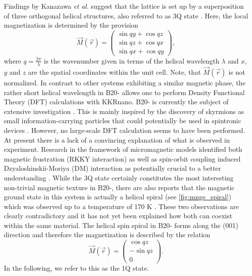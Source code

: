 \documentclass [a4paper, 12pt]{article}
\newcommand{\beq}{\begin{equation}}
\newcommand{\eeq}{\end{equation}}
\begin{document}
Findings by Kanazawa \textit{et al.} suggest that the lattice is set up by a superposition of three orthogonal
helical structures, also referred to as 3Q state \cite{kanazawa_noncentrosymmetric_2017}. 
Here, the local magnetization is determined by the provision
\beq
\label{eq:3q_formula}
\vec{M}(\vec{r}) =
\begin{pmatrix}
	\sin{qy} + \cos{qz} \\
	\sin{qz} + \cos{qx} \\
	\sin{qx} + \cos{qy}
\end{pmatrix},
\eeq
where $q=\frac{2\pi}{\lambda}$ is the wavenumber given in terms of the helical wavelength $\lambda$ and
$x$, $y$ and $z$ are the spatial coordinates within the unit cell.
Note, that $\vec{M}(\vec{r})$ is not normalized.
In contrast to other systems exhibiting a
similar magnetic phase, the rather short helical wavelength in B20- allows one to perform
Density Functional Theory (DFT) 
calculations with KKRnano.
B20- is currently the subject of extensive
investigation
\cite{kanazawa_large_2011,kanazawa_possible_2012,grigoriev_chiral_2013,tanigaki_real-space_2015,martin_magnetic_2016}.
This is mainly inspired by the discovery of skyrmions as small information-carrying particles
that could potentially be used in spintronic devices \cite{fert_magnetic_2017}.
However, no large-scale DFT calculation seems to have been performed.
At present there is a lack of a convincing explanation
of what is observed in experiment. Research in the framework of micromagnetic models identified both
magnetic frustration (RKKY interaction) as well as spin-orbit coupling induced Dzyaloshinskii-Moriya (DM)
interaction as potentially crucial to a better
understanding \cite{altynbaev_hidden_2016,koretsune_control_2015}. 
While the 3Q state certainly constitutes the most interesting non-trivial magnetic texture 
in B20-, there are also reports that the magnetic ground state in this system is
actually a helical spiral (see \cref{fig:mnge_spiral}) \cite{yaouanc_magnetic_2017} which was observed up
to a temperature of 170 K \cite{makarova_neutron_2012}.
These two observations are clearly contradictory and it has not yet been explained how
both can coexist within the same material.
The helical spin spiral in B20- forms along the (001) direction and therefore the magnetization
is described by the relation
\beq
\label{eq:1q_spiral}
\vec{M}(\vec{r}) =
\begin{pmatrix}
	 \cos{qz} \\
	-\sin{qz}  \\
	0
\end{pmatrix}
.
\eeq
In the following, we refer to this as the 1Q state.
\end{document}
